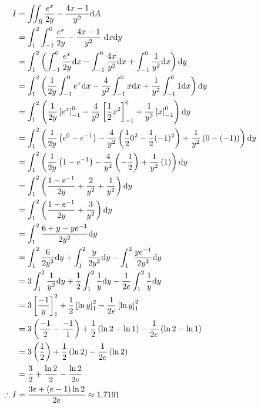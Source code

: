 \documentclass[a4paper,12pt]{report}
\begin{document}
\newpage
{}
\sol
\begin{align*}
  I &= \iint_R \frac{e^x}{2y} - \frac{4x - 1}{y^2} \mathrm{d} A \\
    &= \int_{1}^{2}\int_{-1}^{0} \frac{e^x}{2y} - \frac{4x - 1}{y^2}\ \mathrm{d} x\mathrm{d} y \\
    &= \int_{1}^{2}\left( \int_{-1}^{0} \frac{e^x}{2y}\mathrm{d} x - \int_{-1}^{0}\frac{4x}{y^2}\mathrm{d} x + \int_{-1}^{0}\frac{1}{y^2}\mathrm{d} x \right)\mathrm{d} y \\
    &= \int_{1}^{2}\left( \frac{1}{2y}\int_{-1}^{0} e^x\mathrm{d} x - \frac{4}{y^2}\int_{-1}^{0} x\mathrm{d} x + \frac{1}{y^2}\int_{-1}^{0} 1 \mathrm{d} x \right)\mathrm{d} y \\
    &= \int_{1}^{2}\left( \frac{1}{2y}\left[ e^x \right]_{-1}^{0} - \frac{4}{y^2}\left[ \frac{1}{2}x^2 \right]_{-1}^{0} + \frac{1}{y^2}\left[ x \right]_{-1}^{0} \right)\mathrm{d} y \\
    &= \int_{1}^{2}\left( \frac{1}{2y}\left( e^0 - e^{-1} \right) - \frac{4}{y^2}\left( \frac{1}{2}0^2 - \frac{1}{2}(-1)^2 \right) + \frac{1}{y^2}\left( 0 - (-1) \right) \right)\mathrm{d} y \\
    &= \int_{1}^{2}\left( \frac{1}{2y}\left( 1 - e^{-1} \right) - \frac{4}{y^2}\left( -\frac{1}{2} \right) + \frac{1}{y^2}\left( 1 \right) \right)\mathrm{d} y \\
    &= \int_{1}^{2}\left( \frac{1 - e^{-1}}{2y} + \frac{2}{y^2} + \frac{1}{y^2} \right)\mathrm{d} y \\
    &= \int_{1}^{2}\left( \frac{1 - e^{-1}}{2y} + \frac{3}{y^2} \right)\mathrm{d} y \\
    &= \int_{1}^{2} \frac{6 + y - ye^{-1}}{2y^2} \mathrm{d} y \\
    &= \int_{1}^{2} \frac{6}{2y^2} \mathrm{d} y + \int_{1}^{2} \frac{y}{2y^2} \mathrm{d} y - \int_{1}^{2} \frac{ye^{-1}}{2y^2} \mathrm{d} y \\
    &= 3\int_{1}^{2} \frac{1}{y^2} \mathrm{d} y + \frac{1}{2}\int_{1}^{2} \frac{1}{y} \mathrm{d} y - \frac{1}{2e}\int_{1}^{2} \frac{1}{y} \mathrm{d} y \\
    &= 3\left[ \frac{-1}{y} \right]_{1}^{2} + \frac{1}{2}\left[ \ln y \right]_{1}^{2} - \frac{1}{2e}\left[ \ln y \right]_{1}^{2} \\
    &= 3\left( \frac{-1}{2} - \frac{-1}{1} \right) + \frac{1}{2}\left( \ln2 - \ln1 \right) - \frac{1}{2e}\left( \ln2 - \ln1 \right) \\
    &= 3\left( \frac{1}{2} \right) + \frac{1}{2}\left( \ln2 \right) - \frac{1}{2e}\left( \ln2 \right) \\
    &= \frac{3}{2} + \frac{\ln2}{2} - \frac{\ln2}{2e} \\
  \therefore I &= \frac{3e + (e-1)\ln2}{2e} \approx 1.7191 \\
\end{align*}
\end{document}
